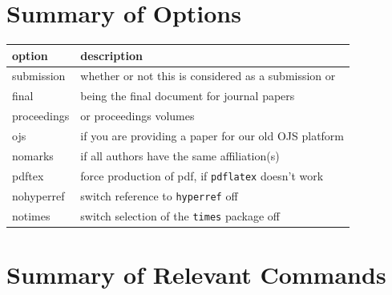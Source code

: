 \documentclass[
submission
]{dmtcs-episciences}
\begin{document}
\section{Summary of Options}
\label{sec:options}
\begin{tabular}{|l|p{8cm}|}
\hline
option & description\\
\hline
submission & whether or not this is considered as a submission or\\
final & being the final document for journal papers\\
proceedings & or proceedings volumes\\
ojs & if you are providing a paper for our old OJS platform\\
\hline
nomarks & if all authors have the same affiliation(s)\\
\hline
pdftex & force production of pdf, if \texttt{pdflatex} doesn't work\\
nohyperref & switch reference to \texttt{hyperref} off\\
notimes & switch selection of the \texttt{times} package off\\
\hline
\end{tabular}


\section{Summary of Relevant Commands}
\label{sec:commands}
\end{document}
